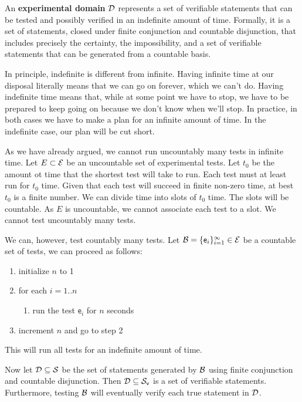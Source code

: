 \documentclass[11pt,letterpaper,fleqn]{memoir} %
\begin{document}
\begin{mathSection}
\begin{defn}
	An \textbf{experimental domain} $\mathcal{D}$ represents a set of verifiable statements that can be tested and possibly verified  in an indefinite amount of time. Formally, it is a set of statements, closed under finite conjunction and countable disjunction, that includes precisely the certainty, the impossibility, and a set of verifiable statements that can be generated from a countable basis.
\end{defn}
\begin{justification}
	In principle, indefinite is different from infinite. Having infinite time at our disposal literally means that we can go on forever, which we can't do. Having indefinite time means that, while at some point we have to stop, we have to be prepared to keep going on because we don't know when we'll stop. In practice, in both cases we have to make a plan for an infinite amount of time. In the indefinite case, our plan will be cut short.
	
	As we have already argued, we cannot run uncountably many tests in infinite time. Let $E \subset \mathcal{E}$ be an uncountable set of experimental tests. Let $t_0$ be the amount ot time that the shortest test will take to run. Each test must at least run for $t_0$ time. Given that each test will succeed in finite non-zero time, at best $t_0$ is a finite number. We can divide time into slots of $t_0$ time. The slots will be countable. As $E$ is uncountable, we cannot associate each test to a slot. We cannot test uncountably many tests.
	
	We can, however, test countably many tests. Let $\mathcal{B} = \{\mathsf{e}_i\}_{i=1}^{\infty} \in \mathcal{E}$ be a countable set of tests, we can proceed as follows:
	\begin{enumerate}
		\item initialize $n$ to 1
		\item for each $i=1..n$
		\begin{enumerate}
			\item run the test $\mathsf{e}_i$ for $n$ seconds
		\end{enumerate}
		\item increment $n$ and go to step 2
	\end{enumerate}	
	This will run all tests for an indefinite amount of time.
	
	Now let $\mathcal{D} \subseteq \mathcal{S}$ be the set of statements generated by $\mathcal{B}$ using finite conjunction and countable disjunction. Then $\mathcal{D} \subseteq \mathcal{S}_\textsf{v}$ is a set of verifiable statements. Furthermore, testing $\mathcal{B}$ will eventually verify each true statement in $\mathcal{D}$.
	

\end{justification}
\end{mathSection}
\end{document}
